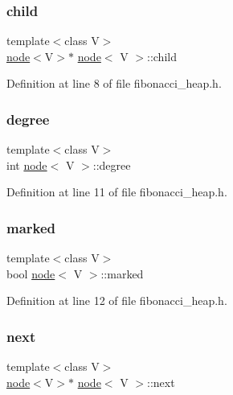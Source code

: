 \subsubsection{\texorpdfstring{child}{child}}
{\footnotesize\ttfamily template$<$class V$>$ \\
\hyperlink{structnode}{node}$<$V$>$$\ast$ \hyperlink{structnode}{node}$<$ V $>$\+::child}



Definition at line 8 of file fibonacci\+\_\+heap.\+h.

\mbox{\label{structnode_ab9c3a691bf0c39288401ae0056b6b0cc}} 
\subsubsection{\texorpdfstring{degree}{degree}}
{\footnotesize\ttfamily template$<$class V$>$ \\
int \hyperlink{structnode}{node}$<$ V $>$\+::degree}



Definition at line 11 of file fibonacci\+\_\+heap.\+h.

\mbox{\label{structnode_a6800b687c66c2087c17d541af91184ff}} 
\subsubsection{\texorpdfstring{marked}{marked}}
{\footnotesize\ttfamily template$<$class V$>$ \\
bool \hyperlink{structnode}{node}$<$ V $>$\+::marked}



Definition at line 12 of file fibonacci\+\_\+heap.\+h.

\mbox{\label{structnode_a5c15f160b3b242d1ee025bdb67c9c798}} 
\subsubsection{\texorpdfstring{next}{next}}
{\footnotesize\ttfamily template$<$class V$>$ \\
\hyperlink{structnode}{node}$<$V$>$$\ast$ \hyperlink{structnode}{node}$<$ V $>$\+::next}



